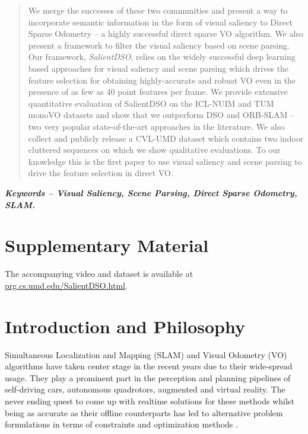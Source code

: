\documentclass[letterpaper, 10 pt, conference]{ieeeconf}  %
\begin{document}
\begin{abstract}
\indent We merge the successes of these two communities and present a way to incorporate semantic information in the form of visual saliency to Direct Sparse Odometry -- a highly successful direct sparse VO algorithm. We also present a framework to filter the visual saliency based on scene parsing. Our framework,  \textit{SalientDSO}, relies on the widely successful deep learning based approaches for visual saliency and scene parsing which drives the feature selection for obtaining highly-accurate and robust VO even in the presence of as few as 40 point features per frame. We provide extensive quantitative evaluation of SalientDSO on the ICL-NUIM and TUM monoVO datasets and show that we outperform DSO and ORB-SLAM -- two very popular state-of-the-art approaches in the literature. We also collect and publicly release a CVL-UMD dataset which contains two indoor cluttered sequences on which we show qualitative evaluations. To our knowledge this is the first paper to use visual saliency and scene parsing to drive the feature selection in direct VO.


\end{abstract}


\textbf{\textit{\small{Keywords -- Visual Saliency, Scene Parsing, Direct Sparse Odometry, SLAM.}}}

\section*{Supplementary Material}
The accompanying video and dataset is available at
\url{prg.cs.umd.edu/SalientDSO.html}.

\section{Introduction and Philosophy}
Simultaneous Localization and Mapping (SLAM) and Visual Odometry (VO) algorithms have taken center stage in the recent years due to their wide-spread usage. They play a prominent part in the perception and planning pipelines of self-driving cars, autonomous quadrotors,  augmented and virtual reality. The never ending quest to come up with realtime solutions for these methods whilst being as accurate as their offline counterparts has led to alternative problem formulations in terms of constraints and optimization methods \cite{monoslam, PTAM, DTAM, LSDSLAM}. 
\end{document}

